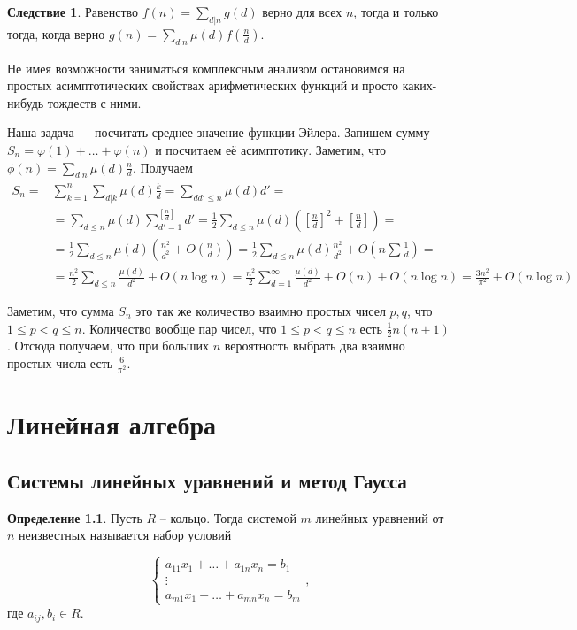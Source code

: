 \documentclass[10pt,a4paper,oneside]{book}
\theoremstyle{definition}
\newtheorem{defn}{Определение}
\newtheorem{cor}{Следствие}
\def\ffi{\varphi}
\def\dfn{\begin{defn}}
\def\edfn{\end{defn}}
\def\crl{\begin{cor}}
\def\ecrl{\end{cor}}
\begin{document}
\crl Равенство $f(n)=\sum_{d|n} g(d)$ верно для всех $n$, тогда и только тогда, когда верно $g(n)=\sum_{d|n} \mu(d)f(\frac{n}{d})$.
\ecrl

Не имея возможности заниматься комплексным анализом остановимся на простых асимптотических свойствах арифметических функций и просто каких-нибудь тождеств с ними.

Наша задача --- посчитать среднее значение функции Эйлера. Запишем сумму $S_n=\ffi(1)+\dots+\ffi(n)$ и посчитаем её асимптотику. Заметим, что $\phi(n)=\sum_{d|n}\mu(d)\frac{n}{d}$. Получаем 
$$\begin{aligned}
S_n=&\sum_{k=1}^n\sum_{d|k}\mu(d)\frac{k}{d}=\sum_{dd'\leq n} \mu(d)d'=\\
&=\sum_{d\leq n}\mu(d)\sum_{d'=1}^{[\frac{n}{d}]} d'=\frac{1}{2}\sum_{d\leq n}\mu(d)([\frac{n}{d}]^2+[\frac{n}{d}])=\\
&=\frac{1}{2}\sum_{d\leq n}\mu(d)(\frac{n^2}{d^2}+O(\frac{n}{d}))=\frac{1}{2}\sum_{d\leq n}\mu(d)\frac{n^2}{d^2}+O(n\sum \frac{1}{d})=\\
&=\frac{n^2}{2}\sum_{d\leq n}\frac{\mu(d)}{d^2}+O(n\log n)=\frac{n^2}{2}\sum_{d=1}^{\infty}\frac{\mu(d)}{d^2}+O(n)+O(n\log n)= \frac{3n^2}{\pi^2}+O(n\log n)
\end{aligned}$$

Заметим, что сумма $S_n$ это так же количество взаимно простых чисел $p,q$, что $1\leq p<q\leq n$. Количество вообще пар чисел, что  $1\leq p<q\leq n$ есть $\frac{1}{2}n(n+1)$. Отсюда получаем, что при больших $n$ вероятность выбрать два взаимно простых числа есть $\frac{6}{\pi^2}$.




\chapter{Линейная алгебра}

\setcounter{zad}{0}
\setcounter{lem}{0}
\setcounter{thm}{0}
\setcounter{defn}{0}
\setcounter{cor}{0}

\section{Системы линейных уравнений и метод Гаусса}

\dfn Пусть $R$ -- кольцо. Тогда системой $m$ линейных уравнений от $n$ неизвестных называется набор условий

$$\begin{cases}
a_{11}x_1+\dots + a_{1n}x_n=b_1\\
\vdots \\
a_{m1}x_1+\dots+a_{mn}x_n=b_m
\end{cases},$$
где $a_{ij}, b_i \in R$.
\edfn
\end{document}
